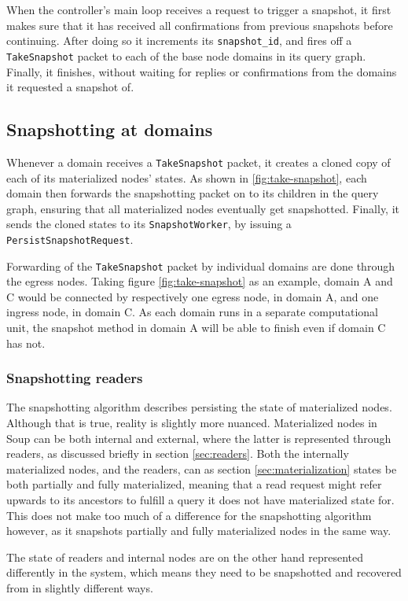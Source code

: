 \documentclass[b5paper]{report}
\begin{document}
When the controller's main loop receives a request to trigger a snapshot, it
first makes sure that it has received all confirmations from previous
snapshots before continuing. After doing so it increments its
\texttt{snapshot\_id}, and fires off a \texttt{TakeSnapshot} packet to each of
the base node domains in its query graph. Finally, it finishes, without waiting
for replies or confirmations from the domains it requested a snapshot of.

\subsection{Snapshotting at domains}
Whenever a domain receives a \texttt{TakeSnapshot} packet, it creates a cloned
copy of each of its materialized nodes' states. As shown in
\ref{fig:take-snapshot}, each domain then forwards the snapshotting packet on to
its children in the query graph, ensuring that all materialized nodes eventually
get snapshotted. Finally, it sends the cloned states to its
\texttt{SnapshotWorker}, by issuing a \texttt{PersistSnapshotRequest}.

Forwarding of the \texttt{TakeSnapshot} packet by individual domains are done
through the egress nodes. Taking figure \ref{fig:take-snapshot} as an example,
domain A and C would be connected by respectively one egress node, in domain A,
and one ingress node, in domain C. As each domain runs in a separate
computational unit, the snapshot method in domain A will be able to finish even
if domain C has not.

\subsubsection{Snapshotting readers}
The snapshotting algorithm describes persisting the state of materialized nodes.
Although that is true, reality is slightly more nuanced. Materialized nodes in
Soup can be both internal and external, where the latter is represented through
readers, as discussed briefly in section \ref{sec:readers}. Both the internally
materialized nodes, and the readers, can as section \ref{sec:materialization}
states be both partially and fully materialized, meaning that a read request
might refer upwards to its ancestors to fulfill a query it does not have
materialized state for. This does not make too much of a difference for the
snapshotting algorithm however, as it snapshots partially and fully materialized
nodes in the same way.

The state of readers and internal nodes are on the other hand represented
differently in the system, which means they need to be snapshotted and recovered
from in slightly different ways.
\end{document}
